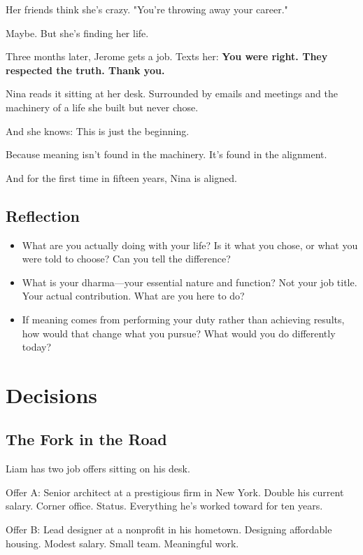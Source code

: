\documentclass[11pt,twoside]{book}
\begin{document}
Her friends think she's crazy. "You're throwing away your career."

Maybe. But she's finding her life.

Three months later, Jerome gets a job. Texts her: \textbf{You were right. They respected the truth. Thank you.}

Nina reads it sitting at her desk. Surrounded by emails and meetings and the machinery of a life she built but never chose.

And she knows: This is just the beginning.

Because meaning isn't found in the machinery. It's found in the alignment.

And for the first time in fifteen years, Nina is aligned.

\section*{Reflection}

\begin{itemize}
\item What are you actually doing with your life? Is it what you chose, or what you were told to choose? Can you tell the difference?
\item What is your dharma—your essential nature and function? Not your job title. Your actual contribution. What are you here to do?
\item If meaning comes from performing your duty rather than achieving results, how would that change what you pursue? What would you do differently today?
\end{itemize}

\chapter{Decisions}

\section*{The Fork in the Road}

Liam has two job offers sitting on his desk.

Offer A: Senior architect at a prestigious firm in New York. Double his current salary. Corner office. Status. Everything he's worked toward for ten years.

Offer B: Lead designer at a nonprofit in his hometown. Designing affordable housing. Modest salary. Small team. Meaningful work.
\end{document}
